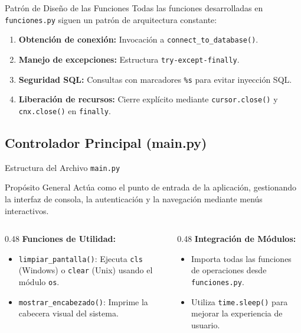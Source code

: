 \documentclass[aspectratio=169, 10pt]{beamer}
\begin{document}
\begin{frame}[t]{Patrón de Diseño de las Funciones}
	\small
	Todas las funciones desarrolladas en \texttt{funciones.py} siguen un patrón de arquitectura constante:
	\vspace{0.15cm}
	\begin{enumerate}
		\setlength{\itemsep}{3pt}
		\item \textbf{Obtención de conexión:} Invocación a \texttt{connect\_to\_database()}.
		\item \textbf{Manejo de excepciones:} Estructura \texttt{try-except-finally}.
		\item \textbf{Seguridad SQL:} Consultas con marcadores \texttt{\%s} para evitar inyección SQL.
		\item \textbf{Liberación de recursos:} Cierre explícito mediante \texttt{cursor.close()} y \texttt{cnx.close()} en \texttt{finally}.
	\end{enumerate}
\end{frame}

\subsection{Controlador Principal (main.py)}

\begin{frame}[t]{Estructura del Archivo \texttt{main.py}}
	\small
	\begin{block}{Propósito General}
		Actúa como el punto de entrada de la aplicación, gestionando la interfaz de consola, la autenticación y la navegación mediante menús interactivos.
	\end{block}
	
	\vspace{0.15cm}
	\begin{columns}[T]
		\begin{column}{0.48\textwidth}
			\textbf{Funciones de Utilidad:}
			\begin{itemize}
				\setlength{\itemsep}{2pt}
				\item \texttt{limpiar\_pantalla()}: Ejecuta \texttt{cls} (Windows) o \texttt{clear} (Unix) usando el módulo \texttt{os}.
				\item \texttt{mostrar\_encabezado()}: Imprime la cabecera visual del sistema.
			\end{itemize}
		\end{column}
		
		\begin{column}{0.48\textwidth}
			\textbf{Integración de Módulos:}
			\begin{itemize}
				\setlength{\itemsep}{2pt}
				\item Importa todas las funciones de operaciones desde \texttt{funciones.py}.
				\item Utiliza \texttt{time.sleep()} para mejorar la experiencia de usuario.
			\end{itemize}
		\end{column}
	\end{columns}
\end{frame}
\end{document}
